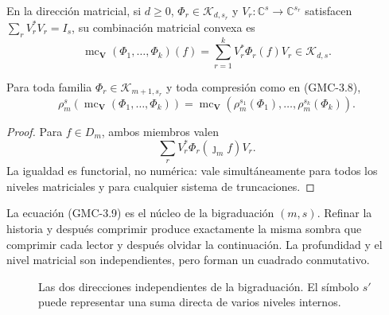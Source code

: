 En la dirección matricial, si $d\ge0$,
$\Phi_r\in\mathcal K_{d,s_r}$ y
$V_r:\mathbb C^s\to\mathbb C^{s_r}$ satisfacen
$\sum_rV_r^*V_r=I_s$, su combinación matricial convexa es
\[
 \operatorname{mc}_{\boldsymbol V}(\Phi_1,\ldots,\Phi_k)(f)
 =\sum_{r=1}^kV_r^*\Phi_r(f)V_r
 \in\mathcal K_{d,s}.
 \tag{GMC-3.8}
\]

\begin{theorem}
\label{p12-83-c22-s4:gmc:thm:conmutacion-ms}
Para toda familia $\Phi_r\in\mathcal K_{m+1,s_r}$ y toda compresión como en
\textup{(GMC-3.8)},
\[
 \rho_m^s\!\left(
   \operatorname{mc}_{\boldsymbol V}(\Phi_1,\ldots,\Phi_k)
 \right)
 =
 \operatorname{mc}_{\boldsymbol V}\!\left(
   \rho_m^{s_1}(\Phi_1),\ldots,\rho_m^{s_k}(\Phi_k)
 \right).
 \tag{GMC-3.9}
\]
\end{theorem}

\begin{proof}
Para $f\in D_m$, ambos miembros valen
\[
 \sum_rV_r^*\Phi_r(\jmath_m f)V_r.
\]
La igualdad es functorial, no numérica: vale simultáneamente para todos los
niveles matriciales y para cualquier sistema de truncaciones.
\end{proof}

\begin{bridgebox}
La ecuación \textup{(GMC-3.9)} es el núcleo de la bigraduación $(m,s)$. Refinar la
historia y después comprimir produce exactamente la misma sombra que
comprimir cada lector y después olvidar la continuación. La profundidad y el
nivel matricial son independientes, pero forman un cuadrado conmutativo.
\end{bridgebox}

\begin{figure}[H]
\centering
{}
\caption{Las dos direcciones independientes de la bigraduación. El símbolo
$s'$ puede representar una suma directa de varios niveles internos.}
\label{p12-83-c22-s4:gmc:fig:cuadrado-ms}
\end{figure}

